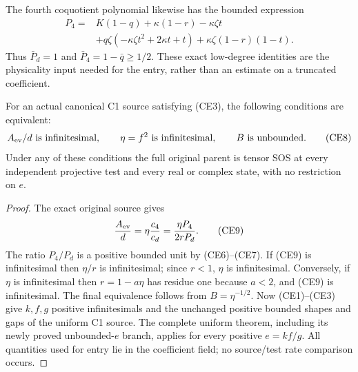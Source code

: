 The fourth coquotient polynomial likewise has the bounded expression
\[
\begin{split}
 P_4={}&K(1-q)+\kappa(1-r)-\kappa\zeta t\\
 &+q\zeta(-\kappa\zeta t^2+2\kappa t+t)
   +\kappa\zeta(1-r)(1-t).
\end{split}                                                       \tag{CE7}
\]
Thus $\bar P_d=1$ and $\bar P_4=1-\bar q\ge1/2$.
These exact low-degree identities are the physicality input needed
for the entry, rather than an estimate on a truncated coefficient.

\begin{theorem}
For an actual canonical C1 source satisfying (CE3), the following
conditions are equivalent:
\[
 A_{\rm ev}/d\text{ is infinitesimal},\qquad
 \eta=f^2\text{ is infinitesimal},\qquad B\text{ is unbounded}.
                                                               \tag{CE8}
\]
Under any of these conditions the full original parent is tensor SOS
at every independent projective test and every real or complex state,
with no restriction on $e$.
\end{theorem}
\begin{proof}
The exact original source gives
\[
 \frac{A_{\rm ev}}d=\eta\frac{c_4}{c_d}
                  =\frac{\eta P_4}{2rP_d}.              \tag{CE9}
\]
The ratio $P_4/P_d$ is a positive bounded unit by (CE6)--(CE7).
If (CE9) is infinitesimal then $\eta/r$ is infinitesimal; since $r<1$,
$\eta$ is infinitesimal. Conversely, if $\eta$ is infinitesimal then
$r=1-a\eta$ has residue one because $a<2$, and (CE9) is infinitesimal.
The final equivalence follows from $B=\eta^{-1/2}$.
Now (CE1)--(CE3) give $k,f,g$ positive infinitesimals and the unchanged
positive bounded shapes and gaps of the uniform C1 source. The complete
uniform theorem, including its newly proved unbounded-$e$ branch,
applies for every positive $e=kf/g$. All quantities used for entry lie
in the coefficient field; no source/test rate comparison occurs.
\end{proof}


